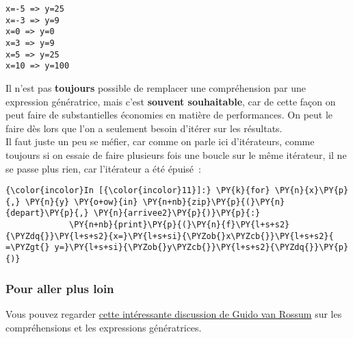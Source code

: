     \begin{Verbatim}[commandchars=\\\{\}]
x=-5 => y=25
x=-3 => y=9
x=0 => y=0
x=3 => y=9
x=5 => y=25
x=10 => y=100

    \end{Verbatim}

    Il n'est pas \textbf{toujours} possible de remplacer une compréhension
par une expression génératrice, mais c'est \textbf{souvent souhaitable},
car de cette façon on peut faire de substantielles économies en matière
de performances. On peut le faire dès lors que l'on a seulement besoin
d'itérer sur les résultats.\\

    Il faut juste un peu se méfier, car comme on parle ici d'itérateurs,
comme toujours si on essaie de faire plusieurs fois une boucle sur le
même itérateur, il ne se passe plus rien, car l'itérateur a été épuisé~:

    \begin{Verbatim}[commandchars=\\\{\}]
{\color{incolor}In [{\color{incolor}11}]:} \PY{k}{for} \PY{n}{x}\PY{p}{,} \PY{n}{y} \PY{o+ow}{in} \PY{n+nb}{zip}\PY{p}{(}\PY{n}{depart}\PY{p}{,} \PY{n}{arrivee2}\PY{p}{)}\PY{p}{:}
             \PY{n+nb}{print}\PY{p}{(}\PY{n}{f}\PY{l+s+s2}{\PYZdq{}}\PY{l+s+s2}{x=}\PY{l+s+si}{\PYZob{}x\PYZcb{}}\PY{l+s+s2}{ =\PYZgt{} y=}\PY{l+s+si}{\PYZob{}y\PYZcb{}}\PY{l+s+s2}{\PYZdq{}}\PY{p}{)}
\end{Verbatim}


    \hypertarget{pour-aller-plus-loin}{%
\subsubsection{Pour aller plus loin}\label{pour-aller-plus-loin}}

    Vous pouvez regarder
\href{http://python-history.blogspot.fr/2010/06/from-list-comprehensions-to-generator.html}{cette
intéressante discussion de Guido van Rossum} sur les compréhensions et
les expressions génératrices.